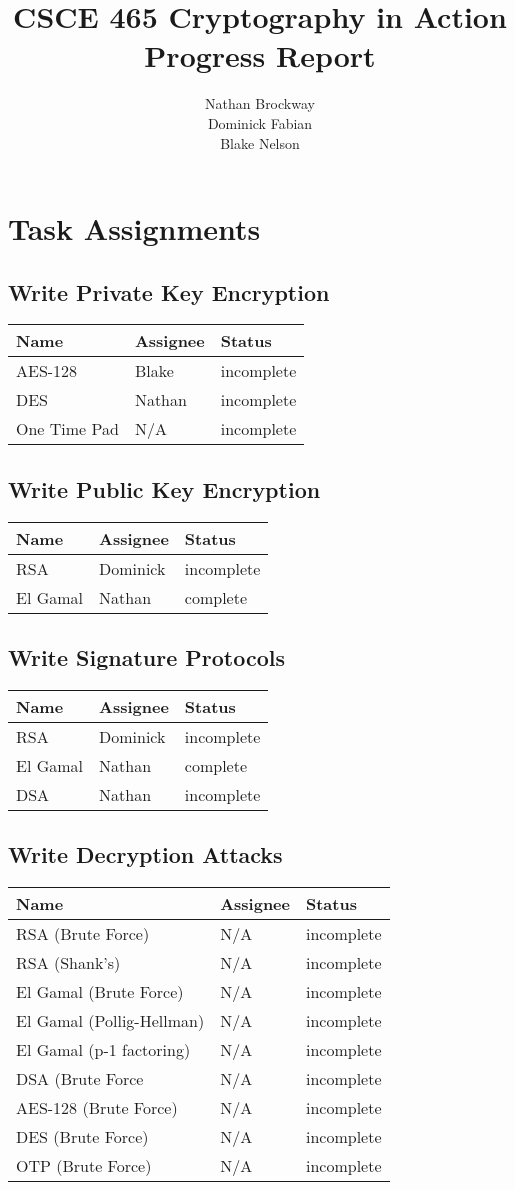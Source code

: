 \documentclass{report}
\title{CSCE 465 Cryptography in Action Progress Report}
\author{Nathan Brockway\\Dominick Fabian\\Blake Nelson}
\begin{document}
\maketitle

\begin{abstract}
    \blindtext
    \blindtext
\end{abstract}

\section{Task Assignments}
\subsection{Write Private Key Encryption}
\begin{tabular}{l|l|l}
Name & Assignee & Status \\ \hline
AES-128 & Blake & incomplete \\
DES & Nathan & incomplete \\
One Time Pad & N/A & incomplete	 
\end{tabular}
\subsection{Write Public Key Encryption}
\begin{tabular}{l|l|l}
Name & Assignee & Status \\ \hline
RSA & Dominick & incomplete \\
El Gamal & Nathan & complete
\end{tabular}
\subsection{Write Signature Protocols}
\begin{tabular}{l|l|l}
Name & Assignee & Status \\ \hline
RSA & Dominick & incomplete \\
El Gamal & Nathan & complete \\
DSA & Nathan & incomplete	 
\end{tabular}
\subsection{Write Decryption Attacks}
\begin{tabular}{l|l|l}
Name & Assignee & Status \\ \hline
RSA (Brute Force) & N/A & incomplete \\
RSA (Shank's) & N/A & incomplete \\
El Gamal (Brute Force) & N/A & incomplete \\
El Gamal (Pollig-Hellman) & N/A & incomplete \\
El Gamal (p-1 factoring) & N/A & incomplete \\
DSA (Brute Force & N/A & incomplete \\
AES-128 (Brute Force) & N/A & incomplete \\
DES (Brute Force) & N/A & incomplete \\
OTP (Brute Force) & N/A & incomplete 
\end{tabular}
\end{document}
